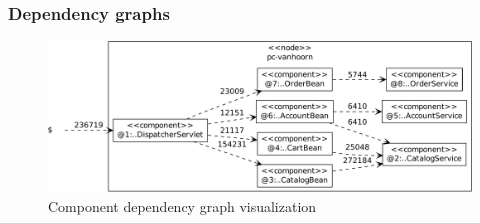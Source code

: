 \subsubsection{Dependency graphs}


\begin{figure}\centering
\includegraphics[width=\columnwidth]{figures/20090710-163529-jpetstore-250Threads-400sDuration-200sRampup-sequenceDiagram--20100428-componentDependencyGraph}%
\caption{Component dependency graph visualization %
}
\label{fig:vis:jpetComponentDepDiagr}
\end{figure}

